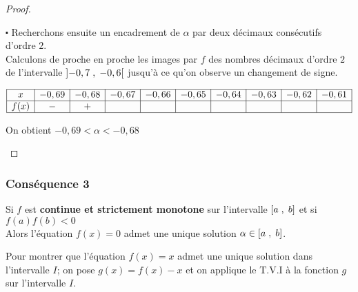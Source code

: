 \begin{proof}
\begin{enumerate}
$ \centerdot $ Recherchons ensuite  un encadrement de $ \alpha $ par deux décimaux consécutifs d'ordre $ 2. $\\
Calculons de proche en proche les images par $ f $  des nombres décimaux d'ordre $ 2 $ de l'intervalle $ \left]-0,7 \;,\; -0,6\right[ $ jusqu'à ce qu'on observe un changement de signe.

\begin{center}
$\begin{array}{|c|c|c|c|c|c|c|c|c|c|}
\hline 
x &-0,69  &-0,68 & -0,67 &- 0,66 & -0,65 & -0,64 &-0,63 &-0,62& -0,61  \\
\hline
f(x) & - &  +  &  &   &  &  &  &  &  \\
\hline
\end{array}$

\vspace{0.5cm}   On obtient $-0,69<\alpha< - 0,68  $

\end{center}
\end{enumerate}
  \end{proof}
  \subsubsection*{Conséquence 3}
  
 Si $ f $ est \textbf{\color{magenta}continue et strictement monotone} sur  l'intervalle $ \left[a\;,\; b\right] $ et si \colorbox{green!20!}{$ f(a)f(b) < 0 $ }\\
Alors l'équation $ f(x)=0 $ admet une  unique  solution $ \alpha \in \left[a\;,\; b\right] $.

\begin{remark}
Pour montrer que l'équation $ f(x)=x $ admet une  unique  solution dans l'intervalle $I$; on pose $ g(x)=f(x)-x $ et on applique le T.V.I à la fonction $ g $ sur l'intervalle $I$.
\end{remark}

